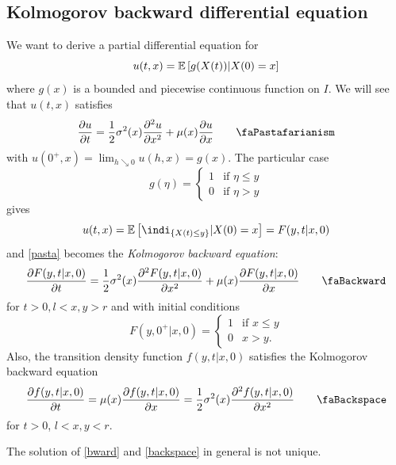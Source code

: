 \documentclass[12pt]{report}
\begin{document}
\subsection{Kolmogorov backward differential equation}
We want to derive a partial differential equation for 
\begin{equation*}
	u(t,x)=\mathbb{E}\left[g(X(t))|X(0)=x\right]
\end{equation*}
where $g(x)$ is a bounded and piecewise continuous function on $I$. We will see that $u(t,x)$ satisfies
\begin{equation}
	\frac{\partial u}{\partial t}=\unmezz\sigma^{2}(x)\frac{\partial^{2}u}{\partial x^{2}}+\mu(x)\frac{\partial u}{\partial x}\tag*{\faPastafarianism}\label{pasta}
\end{equation}
with $u(0^{+},x)=\lim_{h\searrow0} u(h,x)=g(x)$. The particular case
\begin{equation*}
	g(\eta)=\begin{cases}
		1&\text{if }\eta\leq y\\
		0&\text{if }\eta>y
	\end{cases}
\end{equation*}
gives
\begin{equation*}
	u(t,x)=\ev{\indi_{\{X(t)\leq y\}}|X(0)=x}=F(y,t|x,0)
\end{equation*}
and \ref{pasta} becomes the \emph{Kolmogorov backward equation}:
\begin{equation*}
	\frac{\partial F(y,t|x,0)}{\partial t}=\unmezz\sigma^{2}(x)\frac{\partial^{2}F(y,t|x,0)}{\partial x^{2}}+\mu(x)\frac{\partial F(y,t|x,0)}{\partial x}\tag*{\faBackward}\label{bward}
\end{equation*}for $t>0,l<x,y>r$ and with initial conditions
\begin{equation*}
	F(y,0^{+}|x,0)=\begin{cases}
		1&\text{if }x\leq y\\
		0&x>y.
	\end{cases}
\end{equation*}
Also, the transition density function $f(y,t|x,0)$ satisfies the Kolmogorov backward equation
\begin{equation*}
	\frac{\partial f(y,t|x,0)}{\partial t}=\mu(x)\frac{\partial f(y,t|x,0)}{\partial x}=\unmezz\sigma^{2}(x)\frac{\partial^{2}f(y,t|x,0)}{\partial x^{2}}\tag*{\faBackspace}\label{backspace}
\end{equation*}
for $t>0$, $l<x,y<r$.
\begin{remark}
	The solution of \ref{bward} and \ref{backspace} in general is not unique.
\end{remark}
\end{document}
